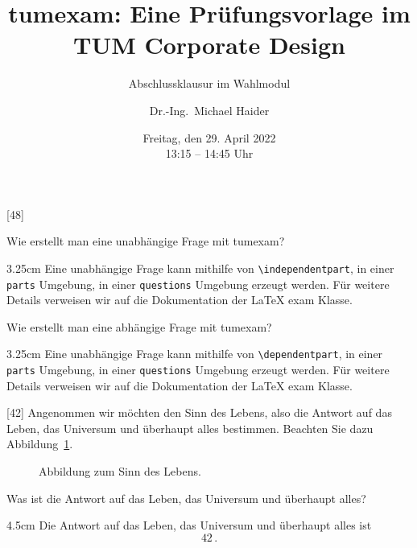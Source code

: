 \documentclass[german, @CLASSOPTIONS@]{tumexam}
\title{tumexam: Eine Prüfungsvorlage im TUM Corporate Design}
\subtitle{Abschlussklausur im Wahlmodul}
\author[orcid=0000-0002-5164-432X]{Dr.-Ing.\ Michael Haider}
\date{Freitag, den 29. April 2022\\
  13:15 -- 14:45 Uhr}
\begin{document}
\maketitle

\clearpage

\begin{questions}
  [48]
  \begin{parts}
    \independentpart
    Wie erstellt man eine unabhängige Frage mit tumexam?
    \begin{solutionbox}{3.25cm}
      Eine unabhängige Frage kann mithilfe von \texttt{\textbackslash{independentpart}}, in einer \texttt{parts} Umgebung, in einer \texttt{questions} Umgebung erzeugt werden. Für weitere Details verweisen wir auf die Dokumentation der \LaTeX{} exam Klasse.
    \end{solutionbox}
    \dependentpart
    Wie erstellt man eine abhängige Frage mit tumexam?
    \begin{solutionbox}{3.25cm}
      Eine unabhängige Frage kann mithilfe von \texttt{\textbackslash{dependentpart}}, in einer \texttt{parts} Umgebung, in einer \texttt{questions} Umgebung erzeugt werden. Für weitere Details verweisen wir auf die Dokumentation der \LaTeX{} exam Klasse.
    \end{solutionbox}
  \end{parts}
  \clearpage
  [42]
  Angenommen wir möchten den Sinn des Lebens, also die Antwort auf das Leben, das Universum und überhaupt alles bestimmen. Beachten Sie dazu Abbildung~\ref{fig-graph-1}.
  \begin{figure}[h]
    \centering
    \caption{Abbildung zum Sinn des Lebens.}
    \label{fig-graph-1}
  \end{figure}
  \begin{parts}
    \independentpart
    Was ist die Antwort auf das Leben, das Universum und überhaupt alles?
    \begin{solutionbox}{4.5cm} %
      Die Antwort auf das Leben, das Universum und überhaupt alles ist
      \begin{equation*}
        42\, .
      \end{equation*}
    \end{solutionbox}
  \end{parts}
  \clearpage
\end{questions}
\end{document}
